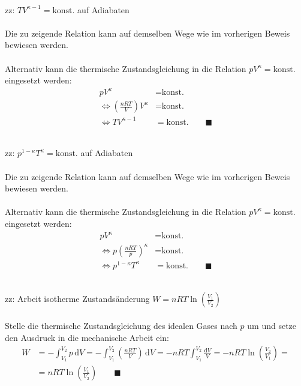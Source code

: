 \documentclass{article}
\newcommand{\diff}{\mathrm{d}}
\newcommand{\lr}[1]{\left(#1\right)}
\begin{document}
{\newpage


	\\
	zz: $T V^{\kappa - 1} = \text{konst.}$ auf Adiabaten\\
	\\
	Die zu zeigende Relation kann auf demselben Wege wie im vorherigen Beweis bewiesen werden.\\
	\\
	Alternativ kann die thermische Zustandsgleichung in die Relation $p V^\kappa = \text{konst.}$ eingesetzt werden:
		\begin{align*}
			p V^\kappa &= \text{konst.} \\
			\Leftrightarrow \lr{ \frac{n R T}{V} } V^\kappa &= \text{konst.} \\
			\Leftrightarrow T V^{\kappa - 1} &= \text{konst.} \qquad \blacksquare
		\end{align*}
	
	
	\\
	zz: $p^{1-\kappa} T^\kappa = \text{konst.}$ auf Adiabaten\\
	\\
	Die zu zeigende Relation kann auf demselben Wege wie im vorherigen Beweis bewiesen werden.\\
	\\
	Alternativ kann die thermische Zustandsgleichung in die Relation $p V^\kappa = \text{konst.}$ eingesetzt werden:
		\begin{align*}
			p V^\kappa &= \text{konst.} \\
			\Leftrightarrow p \lr{ \frac{n R T}{p} }^\kappa &= \text{konst.} \\
			\Leftrightarrow p^{1-\kappa} T^\kappa &= \text{konst.} \qquad \blacksquare
		\end{align*}


	\\
	zz: Arbeit isotherme Zustandsänderung $W = n R T \ln \lr{ \frac{V_1}{V_2} }$\\
\\
	Stelle die thermische Zustandsgleichung des idealen Gases nach $p$ um und setze den Ausdruck in die mechanische Arbeit ein:
		\begin{align*}
			W &= - \int_{V_1}^{V_2} p \, \diff V = -\int_{V_1}^{V_2} \lr{ \frac{n R T}{V} } \, \diff V = -n R T \int_{V_1}^{V_2} \frac{\diff V}{V} = -n R T \ln \lr{ \frac{V_2}{V_1} } = \\
			&= n R T \ln \lr{ \frac{V_1}{V_2} } \qquad \blacksquare
		\end{align*}	
	
}
\end{document}

